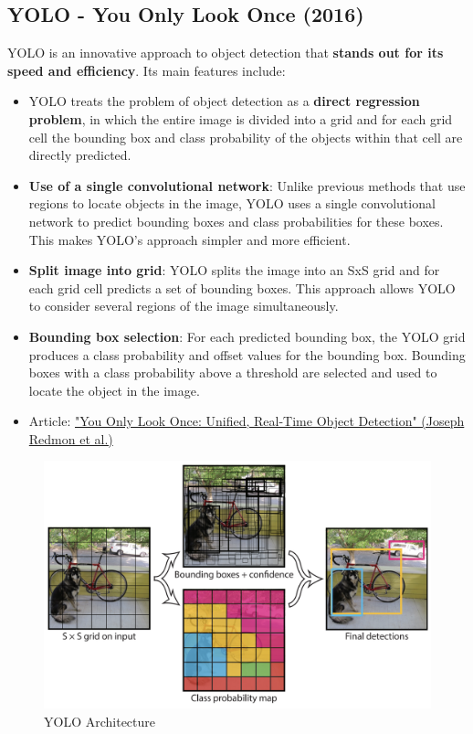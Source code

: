\subsection{YOLO - You Only Look Once (2016)}
YOLO is an innovative approach to object detection that \textbf{stands out for its speed and efficiency}. Its main features include:

\begin{itemize}
    \item YOLO treats the problem of object detection as a \textbf{direct regression problem}, in which the entire image is divided into a grid and for each grid cell the bounding box and class probability of the objects within that cell are directly predicted.
    \item \textbf{Use of a single convolutional network}: Unlike previous methods that use regions to locate objects in the image, YOLO uses a single convolutional network to predict bounding boxes and class probabilities for these boxes. This makes YOLO's approach simpler and more efficient.
    \item \textbf{Split image into grid}: YOLO splits the image into an SxS grid and for each grid cell predicts a set of bounding boxes. This approach allows YOLO to consider several regions of the image simultaneously.
    \item \textbf{Bounding box selection}: For each predicted bounding box, the YOLO grid produces a class probability and offset values for the bounding box. Bounding boxes with a class probability above a threshold are selected and used to locate the object in the image.
    \item Article: \href{https://arxiv.org/pdf/1506.02640.pdf}{"You Only Look Once: Unified, Real-Time Object Detection" (Joseph Redmon et al.)}
\end{itemize}

\begin{figure}[!htbp]
    \centering
    \includegraphics[width=\textwidth]{tikz/chapter5 - YOLO.png}
    \caption{YOLO Architecture}
\end{figure}


